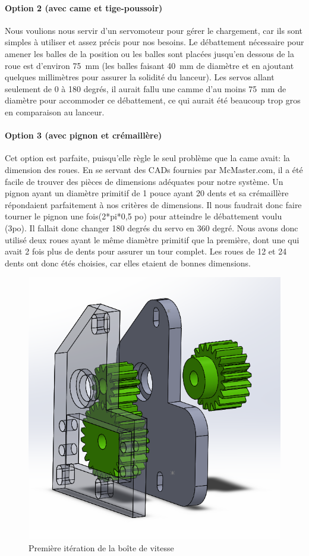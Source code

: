\paragraph{Option 2 (avec came et tige-poussoir)}
Nous voulions nous servir d’un servomoteur pour gérer le chargement, car ils sont simples à utiliser et assez précis pour nos besoins.
Le débattement nécessaire pour amener les balles de la position ou les balles sont placées jusqu’en dessous de la roue est d’environ 75~mm (les balles faisant 40~mm de diamètre et en ajoutant quelques millimètres pour assurer la solidité du lanceur).
Les servos allant seulement de 0 à 180 degrés, il aurait fallu une camme d’au moins 75~mm de diamètre pour accommoder ce débattement, ce qui aurait été beaucoup trop gros en comparaison au lanceur.

\paragraph{Option 3 (avec pignon et crémaillère)}
Cet option est parfaite, puisqu’elle règle le seul problème que la came avait: la dimension des roues.
En se servant des CADs fournies par McMaster.com, il a été facile de trouver des pièces de dimensions adéquates pour notre système.
Un pignon ayant un diamètre primitif de 1 pouce ayant 20 dents et sa crémaillère répondaient parfaitement à nos critères de dimensions.
Il nous faudrait donc faire tourner le pignon une fois(2*pi*0,5 po) pour atteindre le débattement voulu (3po).
Il fallait donc changer 180 degrés du servo en 360 degré.
Nous avons donc utilisé deux roues ayant le même diamètre primitif que la première, dont une qui avait 2 fois plus de dents pour assurer un tour complet.
Les roues de 12 et 24 dents ont donc étés choisies, car elles etaient de bonnes dimensions.

\begin{figure}[h!]
    \centering
    \includegraphics[width=0.5\linewidth]{img/s2/cad/gearbox1}
    \caption{Première itération de la boîte de vitesse}
    \label{fig:s2-cad-gearbox1}
\end{figure}

